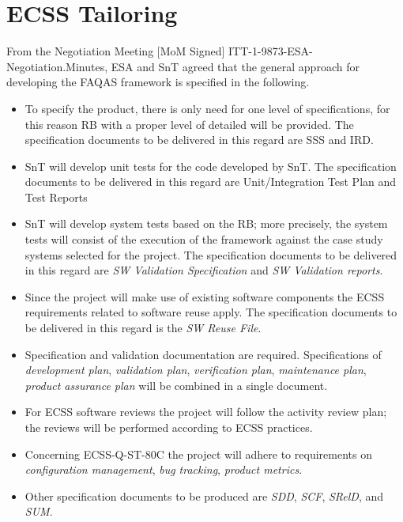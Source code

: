 
\chapter{ECSS Tailoring}

From the Negotiation Meeting [MoM Signed]  ITT-1-9873-ESA-Negotiation.Minutes, ESA and SnT agreed that the general approach for developing the FAQAS framework is specified in the following. 

\begin{itemize}
\item To specify the product, there is only need for one level of specifications, for this reason RB with a proper level of detailed will be provided. 
The specification documents to be delivered in this regard are SSS and IRD.

\item SnT will develop unit tests for the code developed by SnT. 
The specification documents to be delivered in this regard are Unit/Integration Test Plan and Test Reports

\item SnT will develop system tests based on the RB; more precisely, the system tests will consist of the execution of the framework against the case study systems selected for the project. 
The specification documents to be delivered in this regard are \emph{SW Validation Specification} and \emph{SW Validation reports}.

\item Since the project will make use of existing software components the ECSS requirements related to software reuse apply. 
The specification documents to be delivered in this regard is the \emph{SW Reuse File}.

\item Specification and validation documentation are required. Specifications of \emph{development plan}, \emph{validation plan}, \emph{verification plan}, \emph{maintenance plan}, \emph{product assurance plan} will be combined in a single document.

\item For ECSS software reviews the project will follow the activity review plan; the reviews will be performed according to ECSS practices.

\item Concerning ECSS-Q-ST-80C the project will adhere to requirements on \emph{configuration management}, \emph{bug tracking}, \emph{product metrics}. 

\item Other specification documents to be produced are \emph{SDD}, \emph{SCF}, \emph{SRelD}, and \emph{SUM}.
\end{itemize}


